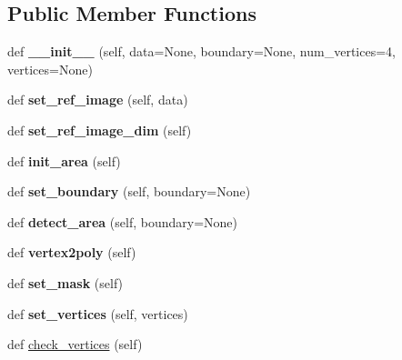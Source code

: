 \subsection*{Public Member Functions}
\begin{DoxyCompactItemize}
\item 
\mbox{\label{class_polygon_1_1_polygon_ac2f8633a32ed5f89ef69e4c90cd5a032}} 
def {\bfseries \+\_\+\+\_\+init\+\_\+\+\_\+} (self, data=None, boundary=None, num\+\_\+vertices=4, vertices=None)
\item 
\mbox{\label{class_polygon_1_1_polygon_aef3adbd2f2a887e5f194da683e0ebb9f}} 
def {\bfseries set\+\_\+ref\+\_\+image} (self, data)
\item 
\mbox{\label{class_polygon_1_1_polygon_ace733b392c2d2f031898041330cfc7a3}} 
def {\bfseries set\+\_\+ref\+\_\+image\+\_\+dim} (self)
\item 
\mbox{\label{class_polygon_1_1_polygon_a41a2f17dc3564340598089bfc96359f8}} 
def {\bfseries init\+\_\+area} (self)
\item 
\mbox{\label{class_polygon_1_1_polygon_a7ef9223a8a4fae0e78089d0872457194}} 
def {\bfseries set\+\_\+boundary} (self, boundary=None)
\item 
\mbox{\label{class_polygon_1_1_polygon_a12906ac4ac6e5ebdc87b5267e4be7649}} 
def {\bfseries detect\+\_\+area} (self, boundary=None)
\item 
\mbox{\label{class_polygon_1_1_polygon_a44a976dbca93b1ed6cb589b1e4c54ec0}} 
def {\bfseries vertex2poly} (self)
\item 
\mbox{\label{class_polygon_1_1_polygon_a3db006b72762578fac8e733745565740}} 
def {\bfseries set\+\_\+mask} (self)
\item 
\mbox{\label{class_polygon_1_1_polygon_ab08a425aa2108468a79662e4a7aa1525}} 
def {\bfseries set\+\_\+vertices} (self, vertices)
\item 
def \mbox{\hyperlink{class_polygon_1_1_polygon_ad6cc83b96e3700ea32fbffc9885e2c8e}{check\+\_\+vertices}} (self)

\end{DoxyCompactItemize}
